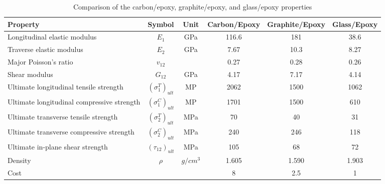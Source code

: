 \documentclass[letterpaper]{IEEEtran}
\begin{document}
\begin{table}[tb]
\caption{Comparison of the carbon/epoxy, graphite/epoxy, and glass/epoxy properties}
\centering
\begin{adjustbox}{width=0.5\textwidth}
\label{tab:mat}
\begin{tabular}{lccccc}
\toprule
Property								   & Symbol				  & Unit  &  Carbon/Epoxy&  Graphite/Epoxy  &  Glass/Epoxy   \\
\midrule
Longitudinal elastic modulus			   & $E_1$				  & GPa   &  116.6       &  181             &  38.6           \\
Traverse elastic modulus				   & $E_2$				  & GPa   &  7.67        &  10.3            &  8.27           \\
Major Poisson's ratio					   & $v_{12}$			  &       &  0.27        &  0.28            &  0.26           \\
Shear modulus							   & $G_{12}$			  & GPa   &  4.17        &  7.17            &  4.14           \\
Ultimate longitudinal tensile strength     & $(\sigma_1^T)_{ult}$ & MP    &  2062        &  1500            &  1062            \\
Ultimate longitudinal compressive strength & $(\sigma_1^C)_{ult}$ & MP    &  1701        &  1500            &  610             \\
Ultimate transverse tensile strength       & $(\sigma_2^T)_{ult}$ & MPa   &  70          &  40              &  31              \\
Ultimate transverse compressive strength   & $(\sigma_2^C)_{ult}$ & MPa   &  240         &  246             &  118              \\
Ultimate in-plane shear strength           & $(\tau_{12})_{ult}$  & MPa   &  105         &  68              &  72               \\
Density                                    & $\rho$               & $g/cm^3$ &  1.605    &  1.590           &  1.903               \\
Cost                                       &                      &       &  8           &  2.5             &  1               \\
\bottomrule
\end{tabular}
\end{adjustbox}
\end{table}
\end{document}
